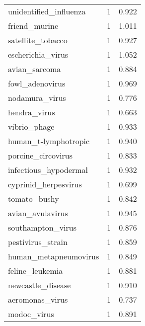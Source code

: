 \begin{tabular}{lrr}
                   unidentified\_influenza &                   1 &     0.922 \\
                            friend\_murine &                   1 &     1.011 \\
                        satellite\_tobacco &                   1 &     0.927 \\
                        escherichia\_virus &                   1 &     1.052 \\
                            avian\_sarcoma &                   1 &     0.884 \\
                          fowl\_adenovirus &                   1 &     0.969 \\
                           nodamura\_virus &                   1 &     0.776 \\
                             hendra\_virus &                   1 &     0.663 \\
                             vibrio\_phage &                   1 &     0.933 \\
                     human\_t-lymphotropic &                   1 &     0.940 \\
                       porcine\_circovirus &                   1 &     0.833 \\
                    infectious\_hypodermal &                   1 &     0.932 \\
                     cyprinid\_herpesvirus &                   1 &     0.699 \\
                             tomato\_bushy &                   1 &     0.842 \\
                         avian\_avulavirus &                   1 &     0.945 \\
                        southampton\_virus &                   1 &     0.876 \\
                        pestivirus\_strain &                   1 &     0.859 \\
                    human\_metapneumovirus &                   1 &     0.849 \\
                          feline\_leukemia &                   1 &     0.881 \\
                        newcastle\_disease &                   1 &     0.910 \\
                          aeromonas\_virus &                   1 &     0.737 \\
                              modoc\_virus &                   1 &     0.891 \\

\end{tabular}
